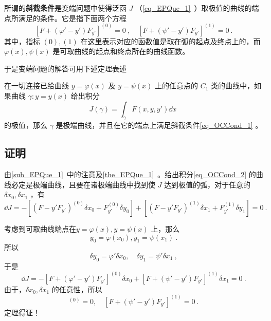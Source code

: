 
所谓的\textbf{斜截条件}是变端问题中使得泛函 $J$ （\autoref{eq_EPQue_1}~）取极值的曲线的端点所满足的条件。它是指下面两个方程
\begin{equation}\label{eq_OCCond_1}
[F+(\varphi'-y')F_{y'}]^{(0)}=0~,\quad [F+(\psi'-y')F_{y'}]^{(1)}=0~.
\end{equation}
其中，指标 ${(0)},{(1)}$ 在这里表示对应的函数值是取在弧的起点及终点上的，而 $\varphi(x),\psi(x)$ 是可取曲线的起点和终点所在的曲线函数。

于是变端问题的解答可用下述定理表述
\begin{theorem}{}
在一切连接已给曲线 $y=\varphi(x)$ 及 $y=\psi(x)$ 上的任意点的 $C_1$ 类的曲线中，如果曲线 $\gamma:y=y(x)$ 给出积分
\begin{equation}\label{eq_OCCond_2}
J(\gamma)=\int_{\gamma}F(x,y,y')\dd x~
\end{equation}
的极值，那么 $\gamma$ 是极端曲线，并且在它的端点上满足斜截条件\autoref{eq_OCCond_1} 。
\end{theorem}
\subsection{证明}
由\autoref{sub_EPQue_1}~中的注意及\autoref{the_EPQue_1}~。给出积分\autoref{eq_OCCond_2} 的曲线必定是极端曲线，且要在诸极端曲线中找到使 $J$ 达到极值的弧，对于任意的 $\delta x_0,\delta x_1$ ，有
\begin{equation}
\dd J=-[(F-y'F_{y'})^{(0)}\delta {x_0}+ F_{y'}^{(0)}\delta y_0]+[(F-y'F_{y'})^{(1)}\delta {x_1}+F_{y'}^{(1)}\delta y_1]=0~.
\end{equation}

 考虑到可取曲线端点在$y=\varphi(x),y=\psi(x)$ 上，那么
 \begin{equation}
 y_0=\varphi(x_0),y_1=\psi(x_1)~.
 \end{equation}
 所以 
 \begin{equation}
 \delta y_0=\varphi'\delta x_0,\quad \delta y_1=\psi'\delta x_1~,
 \end{equation}
 于是
 \begin{equation}
\dd J=-[F+(\varphi'-y')F_{y'}]^{(0)}\delta {x_0}+[F+(\psi'-y')F_{y'}]^{(1)}\delta {x_1}=0~.
\end{equation}
由于，$\delta x_0,\delta x_1$ 的任意性，所以
\begin{equation}
[F+(\varphi'-y')F_{y'}]^{(0)}=0,\quad [F+(\psi'-y')F_{y'}]^{(1)}=0~.
\end{equation}
定理得证！